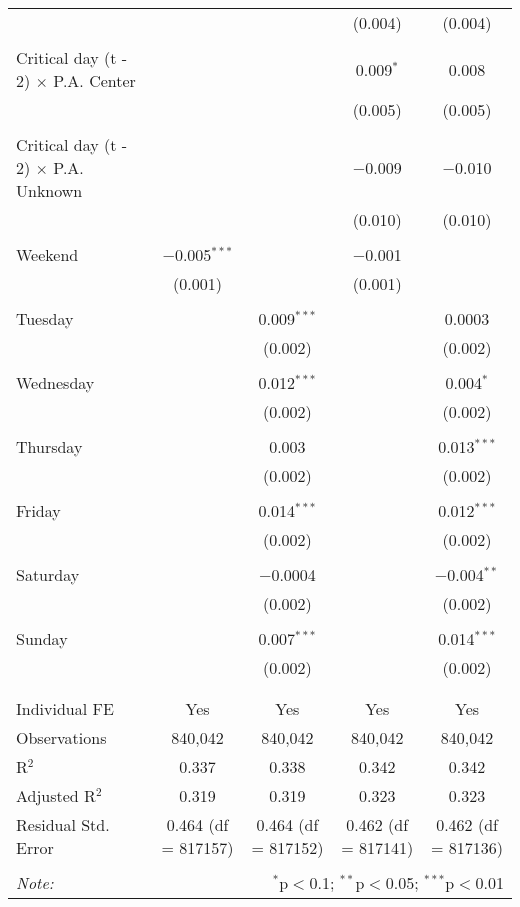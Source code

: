 \documentclass[
]{article}
\begin{document}
\begin{table}[!htbp]
{\begin{tabular}{@{\extracolsep{5pt}}lcccc}
  &  &  & (0.004) & (0.004) \\ 
  & & & & \\ 
 Critical day (t - 2) $\times$ P.A. Center &  &  & 0.009$^{*}$ & 0.008 \\ 
  &  &  & (0.005) & (0.005) \\ 
  & & & & \\ 
 Critical day (t - 2) $\times$ P.A. Unknown &  &  & $-$0.009 & $-$0.010 \\ 
  &  &  & (0.010) & (0.010) \\ 
  & & & & \\ 
 Weekend & $-$0.005$^{***}$ &  & $-$0.001 &  \\ 
  & (0.001) &  & (0.001) &  \\ 
  & & & & \\ 
 Tuesday &  & 0.009$^{***}$ &  & 0.0003 \\ 
  &  & (0.002) &  & (0.002) \\ 
  & & & & \\ 
 Wednesday &  & 0.012$^{***}$ &  & 0.004$^{*}$ \\ 
  &  & (0.002) &  & (0.002) \\ 
  & & & & \\ 
 Thursday &  & 0.003 &  & 0.013$^{***}$ \\ 
  &  & (0.002) &  & (0.002) \\ 
  & & & & \\ 
 Friday &  & 0.014$^{***}$ &  & 0.012$^{***}$ \\ 
  &  & (0.002) &  & (0.002) \\ 
  & & & & \\ 
 Saturday &  & $-$0.0004 &  & $-$0.004$^{**}$ \\ 
  &  & (0.002) &  & (0.002) \\ 
  & & & & \\ 
 Sunday &  & 0.007$^{***}$ &  & 0.014$^{***}$ \\ 
  &  & (0.002) &  & (0.002) \\ 
  & & & & \\ 
\hline \\[-1.8ex] 
Individual FE & Yes & Yes & Yes & Yes \\ 
Observations & 840,042 & 840,042 & 840,042 & 840,042 \\ 
R$^{2}$ & 0.337 & 0.338 & 0.342 & 0.342 \\ 
Adjusted R$^{2}$ & 0.319 & 0.319 & 0.323 & 0.323 \\ 
Residual Std. Error & 0.464 (df = 817157) & 0.464 (df = 817152) & 0.462 (df = 817141) & 0.462 (df = 817136) \\ 
\hline 
\hline \\[-1.8ex] 
\textit{Note:}  & \multicolumn{4}{r}{$^{*}$p$<$0.1; $^{**}$p$<$0.05; $^{***}$p$<$0.01} \\ 
\end{tabular}
} 
\end{table} 
\newpage
\end{document}
